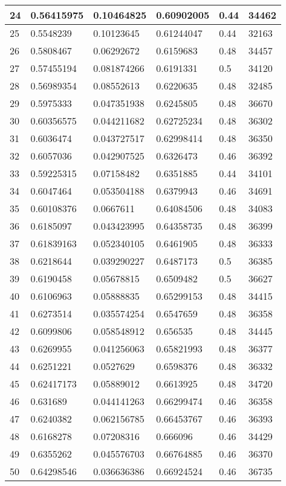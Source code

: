 \begin{longtable}{|l|l|l|l|l|l|}
24 & 0.56415975 & 0.10464825 & 0.60902005 & 0.44 & 34462 \\ \hline 
25 & 0.5548239 & 0.10123645 & 0.61244047 & 0.44 & 32163 \\ \hline 
26 & 0.5808467 & 0.06292672 & 0.6159683 & 0.48 & 34457 \\ \hline 
27 & 0.57455194 & 0.081874266 & 0.6191331 & 0.5 & 34120 \\ \hline 
28 & 0.56989354 & 0.08552613 & 0.6220635 & 0.48 & 32485 \\ \hline 
29 & 0.5975333 & 0.047351938 & 0.6245805 & 0.48 & 36670 \\ \hline 
30 & 0.60356575 & 0.044211682 & 0.62725234 & 0.48 & 36302 \\ \hline 
31 & 0.6036474 & 0.043727517 & 0.62998414 & 0.48 & 36350 \\ \hline 
32 & 0.6057036 & 0.042907525 & 0.6326473 & 0.46 & 36392 \\ \hline 
33 & 0.59225315 & 0.07158482 & 0.6351885 & 0.44 & 34101 \\ \hline 
34 & 0.6047464 & 0.053504188 & 0.6379943 & 0.46 & 34691 \\ \hline 
35 & 0.60108376 & 0.0667611 & 0.64084506 & 0.48 & 34083 \\ \hline 
36 & 0.6185097 & 0.043423995 & 0.64358735 & 0.48 & 36399 \\ \hline 
37 & 0.61839163 & 0.052340105 & 0.6461905 & 0.48 & 36333 \\ \hline 
38 & 0.6218644 & 0.039290227 & 0.6487173 & 0.5 & 36385 \\ \hline 
39 & 0.6190458 & 0.05678815 & 0.6509482 & 0.5 & 36627 \\ \hline 
40 & 0.6106963 & 0.05888835 & 0.65299153 & 0.48 & 34415 \\ \hline 
41 & 0.6273514 & 0.035574254 & 0.6547659 & 0.48 & 36358 \\ \hline 
42 & 0.6099806 & 0.058548912 & 0.656535 & 0.48 & 34445 \\ \hline 
43 & 0.6269955 & 0.041256063 & 0.65821993 & 0.48 & 36377 \\ \hline 
44 & 0.6251221 & 0.0527629 & 0.6598376 & 0.48 & 36332 \\ \hline 
45 & 0.62417173 & 0.05889012 & 0.6613925 & 0.48 & 34720 \\ \hline 
46 & 0.631689 & 0.044141263 & 0.66299474 & 0.46 & 36358 \\ \hline 
47 & 0.6240382 & 0.062156785 & 0.66453767 & 0.46 & 36393 \\ \hline 
48 & 0.6168278 & 0.07208316 & 0.666096 & 0.46 & 34429 \\ \hline 
49 & 0.6355262 & 0.045576703 & 0.66764885 & 0.46 & 36370 \\ \hline 
50 & 0.64298546 & 0.036636386 & 0.66924524 & 0.46 & 36735 \\ \hline 
\end{longtable}